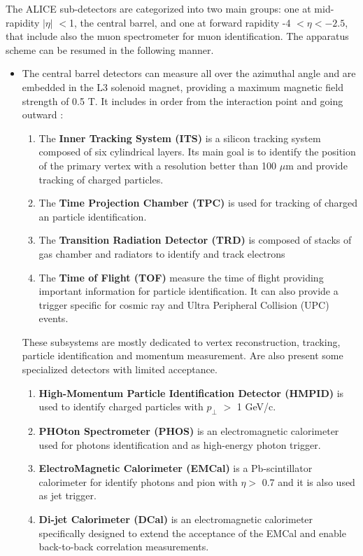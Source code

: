 \documentclass[12pt,a4paper]{book}
\begin{document}
	The ALICE sub-detectors are categorized into two main groups: one at mid-rapidity $|\eta|$ $<$1, the central barrel, and one at forward rapidity -4 $< \eta < -2.5$, that include also the muon spectrometer for muon identification. The apparatus scheme can be resumed in the following manner.
	\begin{itemize}
		\item The central barrel detectors can measure all over the azimuthal angle and are embedded in the L3 solenoid magnet, providing a maximum magnetic field strength of 0.5 T. It includes in order from the interaction point and going outward 
		\cite{Padhan:2924203} \cite{Arata:2922803}:
		\begin{enumerate}
			\item The \textbf{Inner Tracking System (ITS)} is a silicon tracking system composed of six cylindrical layers. Its main goal is to identify the	position of the primary vertex with a resolution better than 100 $\mu$m and provide tracking of charged particles.
			\item The \textbf{ Time Projection Chamber (TPC)} is used for tracking of charged an particle identification.
			\item The \textbf{Transition Radiation Detector (TRD)} is composed of stacks of gas chamber and radiators to identify and track electrons
			\item The \textbf{Time of Flight (TOF)} measure the time of flight providing important information for particle identification. It can also provide a trigger specific for cosmic ray and Ultra Peripheral Collision (UPC) events.
		\end{enumerate}
		These subsystems are mostly dedicated to vertex reconstruction, tracking, particle identification and momentum measurement. Are also present some specialized detectors with limited acceptance. 
		\begin{enumerate}
			\item \textbf{High-Momentum Particle Identification Detector (HMPID)} is used to identify charged particles with $p_\perp$ $>$ 1 GeV/c.
			\item \textbf{PHOton Spectrometer (PHOS)} is an electromagnetic calorimeter used for photons identification and as high-energy photon trigger.
			\item \textbf{ElectroMagnetic Calorimeter (EMCal)} is a Pb-scintillator calorimeter for identify photons and pion with $\eta >$ 0.7 and it is also used as jet trigger.
			\item  \textbf{Di-jet Calorimeter (DCal)} is an electromagnetic calorimeter  specifically designed to extend the acceptance of the EMCal and enable back-to-back correlation measurements.

\end{enumerate}
\end{itemize}
\end{document}
